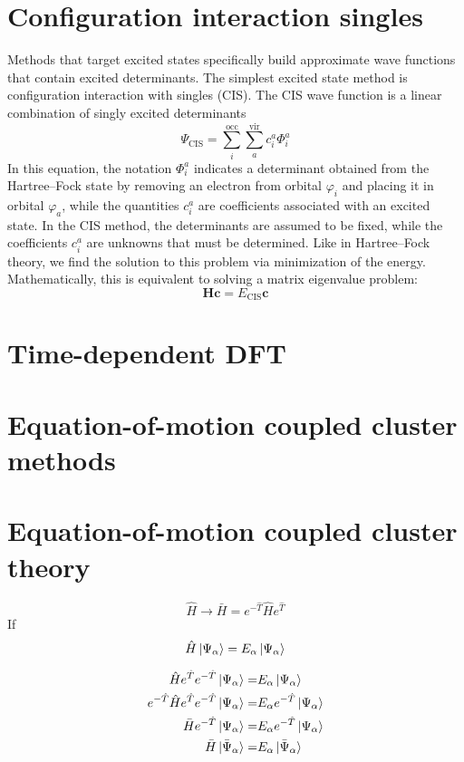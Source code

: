 \documentclass[../Main/notes.tex]{subfiles}
\begin{document}
\section{Configuration interaction singles}
Methods that target excited states specifically build approximate wave functions that contain excited determinants.
The simplest excited state method is configuration interaction with singles (CIS).
The CIS wave function is a linear combination of singly excited determinants
\begin{equation}
\Psi_\mathrm{CIS} = \sum_{i}^{\mathrm{occ}}\sum_{a}^{\mathrm{vir}} c_i^a \Phi_{i}^{a}
\end{equation}
In this equation, the notation $\Phi_{i}^{a}$ indicates a determinant obtained from the Hartree--Fock state by removing an electron from orbital $\varphi_i$ and placing it in orbital $\varphi_a$, while the quantities $c_i^a$ are coefficients associated with an excited state.
In the CIS method, the determinants are assumed to be fixed, while the coefficients $c_i^a$ are unknowns that must be determined.
Like in Hartree--Fock theory, we find the solution to this problem via minimization of the energy. Mathematically, this is equivalent to solving a matrix eigenvalue problem:
\begin{equation}
\mathbf{Hc} = E_\mathrm{CIS} \mathbf{c}
\end{equation}


\section{Time-dependent DFT}

\section{Equation-of-motion coupled cluster methods}

\section{Equation-of-motion coupled cluster theory}
\begin{equation}
\hat{H} \rightarrow \bar{H} = e^{-\hat{T}} \hat{H} e^{\hat{T}} 
\end{equation}
If 
\begin{equation}
\hat{H}  \ket{\Psi_\alpha} = E_\alpha \ket{\Psi_\alpha}
\end{equation}

\begin{equation}
\begin{split}
\hat{H}  e^{\hat{T}} e^{-\hat{T}} \ket{\Psi_\alpha} = & E_\alpha \ket{\Psi_\alpha} \\
e^{-\hat{T}} \hat{H}  e^{\hat{T}} e^{-\hat{T}} \ket{\Psi_\alpha} = & E_\alpha e^{-\hat{T}} \ket{\Psi_\alpha} \\
\bar{H} e^{-\hat{T}} \ket{\Psi_\alpha} = & E_\alpha e^{-\hat{T}} \ket{\Psi_\alpha} \\
\bar{H} \ket{\bar{\Psi}_\alpha} = & E_\alpha \ket{\bar{\Psi}_\alpha} \\
\end{split}
\end{equation}
\end{document}
